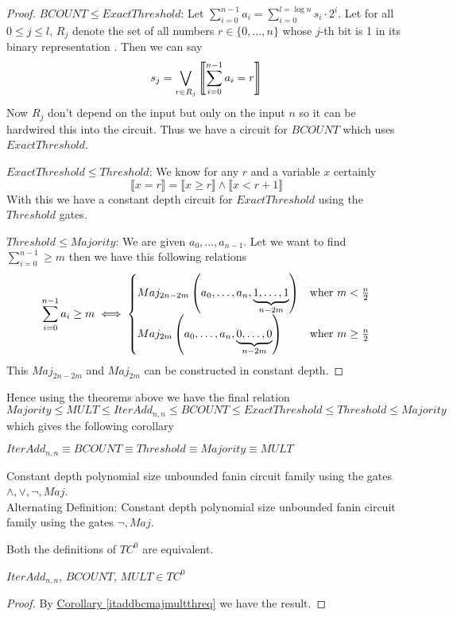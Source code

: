 \begin{proof}
	{$BCOUNT\leq ExactThreshold$}: Let $\sum\limits_{i=0}^{n-1}a_i=\sum\limits_{i=0}^{l=\log n}s_i\cdot 2^i$. Let for all $0\leq j\leq l$, $R_j$ denote the set of all numbers $r\in \{0,\dots,n\}$ whose $j$-th bit is 1 in its binary representation . Then we can say $$s_j=\bigvee_{r\in R_j}\left\llbracket \sum\limits_{i=0}^{n-1}a_i=r\right\rrbracket$$Now $R_j$ don't depend on the input but only on the input $n$ so it can be hardwired this into the circuit. Thus we have a circuit for $BCOUNT$ which uses $ExactThreshold$.
	
	{$ExactThreshold\leq Threshold$}: We know for any $r$ and a variable $x$ certainly $$\llbracket x=r\rrbracket= \llbracket x\geq r\rrbracket \wedge  \llbracket x< r+1\rrbracket$$With this we have a constant depth circuit for $ExactThreshold$ using the $Threshold$ gates.
	
	{$Threshold\leq Majority$}: We are given $a_0,\dots,a_{n-1}$. Let we want to find $\sum\limits_{i=0}^{n-1}\geq m$ then we have this following relations $$\sum\limits_{i=0}^{n-1}a_i\geq m\iff \begin{cases}
		Maj_{2n-2m}\left(a_0,\dots, a_n,\underbrace{1,\dots,1}_{n-2m}\right) & \text{wher $m<\frac{n}{2}$}\\
		Maj_{2m}\left(a_0,\dots, a_n,\underbrace{0,\dots,0}_{n-2m}\right) & \text{wher $m\geq\frac{n}{2}$}
	\end{cases}$$
	This $Maj_{2n-2m}$ and $Maj_{2m}$ can be constructed in constant depth.
\end{proof}

\begin{remark}
	Hence using the theorems above we have the final relation $$Majority\leq MULT\leq IterAdd_{n,n}\leq BCOUNT\leq ExactThreshold\leq Threshold\leq Majority$$ which gives the following corollary
\end{remark}

\begin{corollary}\label{itaddbcmajmultthreq}
	$IterAdd_{n,n}\equiv BCOUNT\equiv Threshold \equiv Majority \equiv MULT$
\end{corollary}


\begin{definition}[$TC^0$]
	Constant depth polynomial size unbounded fanin circuit family using the gates $\wedge, \vee, \neg,Maj$.\\
	Alternating Definition: Constant depth polynomial size unbounded fanin circuit family using the gates $ \neg,Maj$.
\end{definition}
\begin{theorem}
	Both the definitions of $TC^0$ are equivalent.
\end{theorem}

\begin{theorem}
	$IterAdd_{n,n}$, $BCOUNT$, $MULT\in TC^0$
\end{theorem}
\begin{proof}
	By \hyperref[itaddbcmajmultthreq]{Corollary \ref{itaddbcmajmultthreq}} we have the result.
\end{proof}
